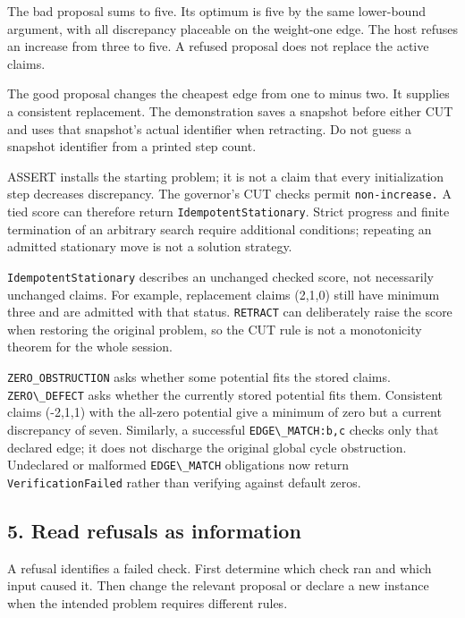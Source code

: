 \documentclass[
  11pt,
]{article}
\newcommand{\passthrough}[1]{#1}
\begin{document}
The bad proposal sums to five. Its optimum is five by the same
lower-bound argument, with all discrepancy placeable on the weight-one
edge. The host refuses an increase from three to five. A refused
proposal does not replace the active claims.

The good proposal changes the cheapest edge from one to minus two. It
supplies a consistent replacement. The demonstration saves a snapshot
before either CUT and uses that snapshot's actual identifier when
retracting. Do not guess a snapshot identifier from a printed step
count.

ASSERT installs the starting problem; it is not a claim that every
initialization step decreases discrepancy. The governor's CUT checks
permit \nolinkurl{non-increase.} A tied score can therefore return
\nolinkurl{IdempotentStationary}. Strict progress and finite termination
of an arbitrary search require additional conditions; repeating an
admitted stationary move is not a solution strategy.

\nolinkurl{IdempotentStationary} describes an unchanged checked score,
not necessarily unchanged claims. For example, replacement claims
(2,1,0) still have minimum three and are admitted with that status.
\passthrough{\lstinline!RETRACT!} can deliberately raise the score when
restoring the original problem, so the CUT rule is not a monotonicity
theorem for the whole session.

\nolinkurl{ZERO_OBSTRUCTION} asks whether some potential fits the stored
claims. \passthrough{\lstinline!ZERO\_DEFECT!} asks whether the
currently stored potential fits them. Consistent claims (-2,1,1) with
the all-zero potential give a minimum of zero but a current discrepancy
of seven. Similarly, a successful
\passthrough{\lstinline!EDGE\_MATCH:b,c!} checks only that declared
edge; it does not discharge the original global cycle obstruction.
Undeclared or malformed \passthrough{\lstinline!EDGE\_MATCH!}
obligations now return \nolinkurl{VerificationFailed} rather than
verifying against default zeros.

\subsection{5. Read refusals as
information}\label{read-refusals-as-information}

A refusal identifies a failed check. First determine which check ran and
which input caused it. Then change the relevant proposal or declare a
new instance when the intended problem requires different rules.
\end{document}
